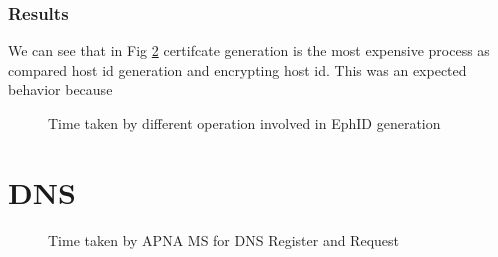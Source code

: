 \subsubsection{Results}
We can see that in Fig \ref{fig:perf_ephid} certifcate generation is the most expensive process as compared host id generation and encrypting host id. This was an expected behavior because 
\begin{figure}[th!!]
\centering
\noindent
{}
\decoRule
\caption[EphID Generation Ops]{Time taken by different operation involved in EphID generation}
\label{fig:perf_ephid}
\end{figure}

\section{DNS}
\begin{figure}[th!!]
\centering
\noindent
{}
\decoRule
\caption[DNS Operations]{Time taken by APNA MS for DNS Register and Request}
\label{fig:perf_ephid}
\end{figure}

